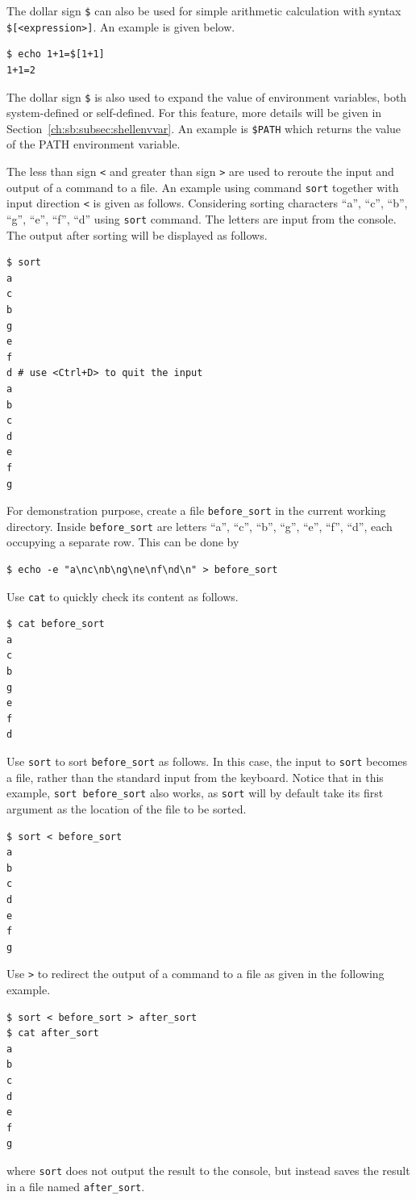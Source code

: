 The dollar sign \verb|$| can also be used for simple arithmetic calculation with syntax \verb|$[<expression>]|. An example is given below.
\begin{lstlisting}
$ echo 1+1=$[1+1]
1+1=2
\end{lstlisting}

The dollar sign \verb|$| is also used to expand the value of environment variables, both system-defined or self-defined. For this feature, more details will be given in Section~\ref{ch:sb:subsec:shellenvvar}. An example is \verb|$PATH| which returns the value of the PATH environment variable.

The less than sign \verb|<| and greater than sign \verb|>| are used to reroute the input and output of a command to a file. An example using command \verb|sort| together with input direction \verb|<| is given as follows. Considering sorting characters ``a'', ``c'', ``b'', ``g'', ``e'', ``f'', ``d'' using \verb|sort| command. The letters are input from the console. The output after sorting will be displayed as follows.
\begin{lstlisting}
$ sort
a
c
b
g
e
f
d # use <Ctrl+D> to quit the input
a
b
c
d
e
f
g
\end{lstlisting}
For demonstration purpose, create a file \verb|before_sort| in the current working directory. Inside \verb|before_sort| are letters ``a'', ``c'', ``b'', ``g'', ``e'', ``f'', ``d'', each occupying a separate row. This can be done by 
\begin{lstlisting}
$ echo -e "a\nc\nb\ng\ne\nf\nd\n" > before_sort
\end{lstlisting}
Use \verb|cat| to quickly check its content as follows.
\begin{lstlisting}
$ cat before_sort
a
c
b
g
e
f
d
\end{lstlisting}
Use \verb|sort| to sort \verb|before_sort| as follows. In this case, the input to \verb|sort| becomes a file, rather than the standard input from the keyboard. Notice that in this example, \verb|sort before_sort| also works, as \verb|sort| will by default take its first argument as the location of the file to be sorted.
\begin{lstlisting}
$ sort < before_sort
a
b
c
d
e
f
g
\end{lstlisting}
Use \verb|>| to redirect the output of a command to a file as given in the following example.
\begin{lstlisting}
$ sort < before_sort > after_sort
$ cat after_sort
a
b
c
d
e
f
g
\end{lstlisting}
where \verb|sort| does not output the result to the console, but instead saves the result in a file named \verb|after_sort|. 

